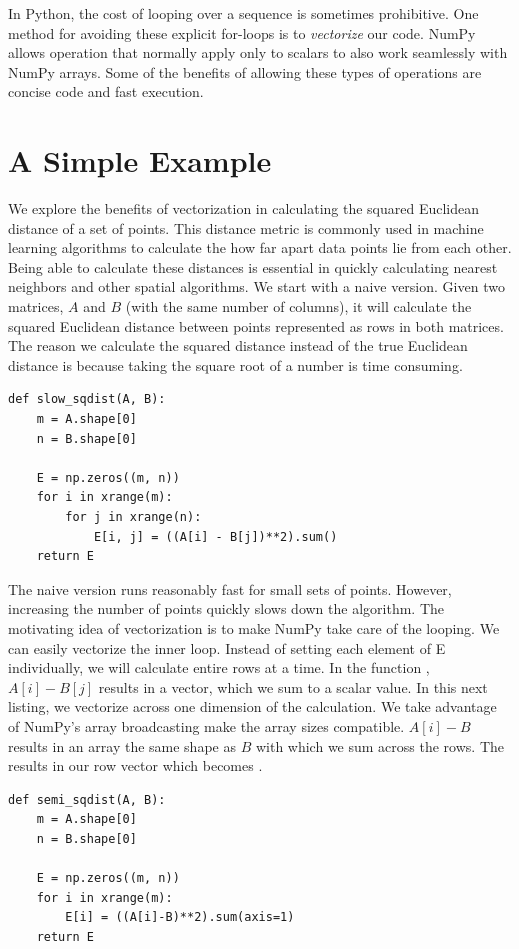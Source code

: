 \label{lab:Python_Vectorization}

In Python, the cost of looping over a sequence is sometimes prohibitive.
One method for avoiding these explicit for-loops is to \emph{vectorize} our code.
NumPy allows operation that normally apply only to scalars to also work seamlessly with NumPy arrays.
Some of the benefits of allowing these types of operations are concise code and fast execution.

\section*{A Simple Example}
We explore the benefits of vectorization in calculating the squared Euclidean distance of a set of points.
This distance metric is commonly used in machine learning algorithms to calculate the how far apart data points lie from each other.
Being able to calculate these distances is essential in quickly calculating nearest neighbors and other spatial algorithms.
We start with a naive version.  Given two matrices, $A$ and $B$ (with the same number of columns), it will calculate the squared Euclidean distance between points
represented as rows in both matrices.  The reason we calculate the squared distance instead of the true Euclidean distance is because
taking the square root of a number is time consuming.
\begin{lstlisting}
def slow_sqdist(A, B):
    m = A.shape[0]
    n = B.shape[0]

    E = np.zeros((m, n))
    for i in xrange(m):
        for j in xrange(n):
            E[i, j] = ((A[i] - B[j])**2).sum()
    return E
\end{lstlisting}
The naive version runs reasonably fast for small sets of points.  However, increasing the number of points quickly slows down the algorithm.
The motivating idea of vectorization is to make NumPy take care of the looping.
We can easily vectorize the inner loop.  Instead of setting each element of E individually, we will calculate entire rows at a time.
In the function , $A[i]-B[j]$ results in a vector, which we sum to a scalar value.
In this next listing, we vectorize across one dimension of the calculation.
We take advantage of NumPy's array broadcasting make the array sizes compatible.
$A[i]-B$ results in an array the same shape as $B$ with which we sum across the rows.  The results in our row vector which becomes .
\begin{lstlisting}
def semi_sqdist(A, B):
    m = A.shape[0]
    n = B.shape[0]

    E = np.zeros((m, n))
    for i in xrange(m):
        E[i] = ((A[i]-B)**2).sum(axis=1)
    return E
\end{lstlisting}
